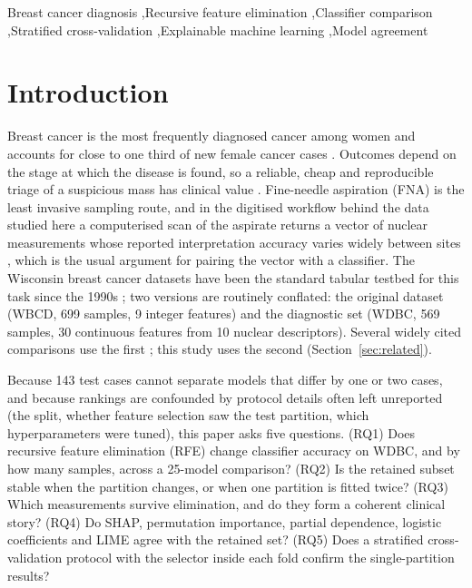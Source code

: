 \documentclass[review,12pt]{elsarticle}
\begin{document}
\begin{frontmatter}
\begin{keyword}
Breast cancer diagnosis \sep Recursive feature elimination \sep Classifier comparison \sep Stratified cross-validation \sep Explainable machine learning \sep Model agreement
\end{keyword}

\end{frontmatter}

\section{Introduction}

Breast cancer is the most frequently diagnosed cancer among women and accounts for close to one third of new female cancer cases \cite{wilkinson2022understanding,kashyap2022global}. Outcomes depend on the stage at which the disease is found, so a reliable, cheap and reproducible triage of a suspicious mass has clinical value \cite{katsura2022breast}. Fine-needle aspiration (FNA) is the least invasive sampling route, and in the digitised workflow behind the data studied here a computerised scan of the aspirate returns a vector of nuclear measurements whose reported interpretation accuracy varies widely between sites \cite{alkuwari2008accuracy}, which is the usual argument for pairing the vector with a classifier. The Wisconsin breast cancer datasets have been the standard tabular testbed for this task since the 1990s \cite{street1993nuclear}; two versions are routinely conflated: the original dataset (WBCD, 699 samples, 9 integer features) and the diagnostic set (WDBC, 569 samples, 30 continuous features from 10 nuclear descriptors). Several widely cited comparisons use the first \cite{salama2012experimental,lavanya2011analysis,hazra2016study,wang2018support}; this study uses the second (Section~\ref{sec:related}).

Because 143 test cases cannot separate models that differ by one or two cases, and because rankings are confounded by protocol details often left unreported (the split, whether feature selection saw the test partition, which hyperparameters were tuned), this paper asks five questions. (RQ1) Does recursive feature elimination (RFE) change classifier accuracy on WDBC, and by how many samples, across a 25-model comparison? (RQ2) Is the retained subset stable when the partition changes, or when one partition is fitted twice? (RQ3) Which measurements survive elimination, and do they form a coherent clinical story? (RQ4) Do SHAP, permutation importance, partial dependence, logistic coefficients and LIME agree with the retained set? (RQ5) Does a stratified cross-validation protocol with the selector inside each fold confirm the single-partition results?
\end{document}
